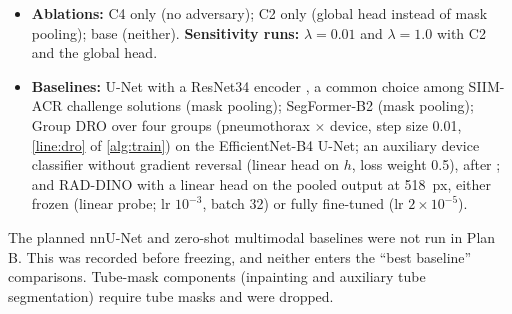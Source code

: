 \documentclass[final,3p]{elsarticle}
\begin{document}
\begin{itemize}
  \item \textbf{Ablations:} C4 only (no adversary); C2 only (global head instead of mask pooling); base (neither). \textbf{Sensitivity runs:} $\lambda=0.01$ and $\lambda=1.0$ with C2 and the global head.
  \item \textbf{Baselines:} U-Net with a ResNet34 encoder \citep{he2016resnet}, a common choice among SIIM-ACR challenge solutions (mask pooling); SegFormer-B2 \citep{xie2021segformer} (mask pooling); Group DRO \citep{sagawa2020groupdro} over four groups (pneumothorax $\times$ device, step size 0.01, \cref{line:dro} of \cref{alg:train}) on the EfficientNet-B4 U-Net; an auxiliary device classifier without gradient reversal (linear head on $h$, loss weight 0.5), after \citet{bandaru2026untreated}; and RAD-DINO \citep{perezgarcia2025raddino} with a linear head on the pooled output at 518~px, either frozen (linear probe; lr $10^{-3}$, batch 32) or fully fine-tuned (lr $2\times10^{-5}$).
\end{itemize}

The planned nnU-Net \citep{isensee2021nnunet} and zero-shot multimodal baselines were not run in Plan B. This was recorded before freezing, and neither enters the ``best baseline'' comparisons. Tube-mask components (inpainting and auxiliary tube segmentation) require tube masks and were dropped.
\end{document}
